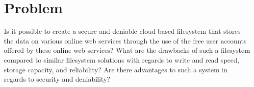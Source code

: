 
\section{Problem}
\label{sec:problem}

Is it possible to create a secure and deniable cloud-based filesystem that stores the data on various online web services through the use of the free user accounts offered by these online web services? What are the drawbacks of such a filesystem compared to similar filesystem solutions with regards to write and read speed, storage capacity, and reliability? Are there advantages to such a system in regards to security and deniability? 



